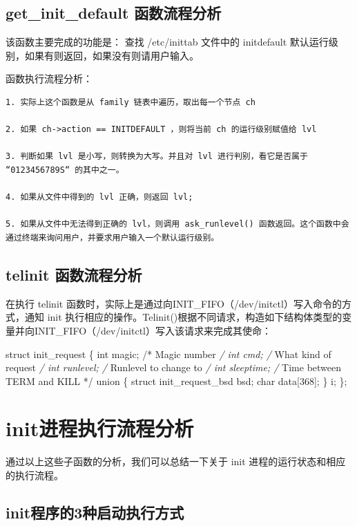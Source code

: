 \subsection{get\_init\_default 函数流程分析}

该函数主要完成的功能是： 查找 /etc/inittab 文件中的 initdefault
默认运行级别，如果有则返回，如果没有则请用户输入。

函数执行流程分析：

{\begin{shaded}\begin{verbatim}
1. 实际上这个函数是从 family 链表中遍历，取出每一个节点 ch

2. 如果 ch->action == INITDEFAULT ，则将当前 ch 的运行级别赋值给 lvl

3. 判断如果 lvl 是小写，则转换为大写。并且对 lvl 进行判别，看它是否属于 “0123456789S“ 的其中之一。

4. 如果从文件中得到的 lvl 正确，则返回 lvl; 

5. 如果从文件中无法得到正确的 lvl，则调用 ask_runlevel() 函数返回。这个函数中会通过终端来询问用户，并要求用户输入一个默认运行级别。
\end{verbatim}\end{shaded}}
\subsection{telinit 函数流程分析}

在执行 telinit
函数时，实际上是通过向INIT\_FIFO（/dev/initctl）写入命令的方式，通知 init
执行相应的操作。Telinit()根据不同请求，构造如下结构体类型的变量并向INIT\_FIFO（/dev/initctl）写入该请求来完成其使命：

struct init\_request \{ int magic; /* Magic number \emph{/ int cmd; /}
What kind of request \emph{/ int runlevel; /} Runlevel to change to
\emph{/ int sleeptime; /} Time between TERM and KILL */ union \{ struct
init\_request\_bsd bsd; char data{[}368{]}; \} i; \};

\section{init进程执行流程分析}

通过以上这些子函数的分析，我们可以总结一下关于 init
进程的运行状态和相应的执行流程。

\subsection{init程序的3种启动执行方式}

